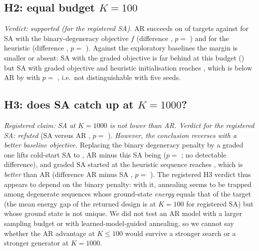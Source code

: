\subsection*{H2: equal budget $K=100$}
\emph{Verdict: supported (for the registered SA).} AR succeeds on  of targets against  for SA with the binary-degeneracy objective $f$ (difference , $p=$ ) and  for the heuristic (difference , $p=$ ). Against the exploratory baselines the margin is smaller or absent: SA with the graded objective is far behind at this budget () but SA with graded objective and heuristic initialisation reaches , which is below AR by  with $p=$ , i.e.\ not distinguishable with five seeds.

\subsection*{H3: does SA catch up at $K=1000$?}
\emph{Registered claim: SA at $K=1000$ is not lower than AR. Verdict for the registered SA: refuted} (SA  versus AR , $p=$ ). \emph{However, the conclusion reverses with a better baseline objective.} Replacing the binary degeneracy penalty by a graded one lifts cold-start SA to , AR minus this SA being  ($p=$ ; no detectable difference), and graded SA started at the heuristic sequence reaches , which is \emph{better} than AR (difference AR minus SA , $p=$ ). The registered H3 verdict thus appears to depend on the binary penalty: with it, annealing seems to be trapped among degenerate sequences whose ground-state \emph{energy} equals that of the target (the mean energy gap of the returned design is  at $K=100$ for registered SA) but whose ground state is not unique. We did not test an AR model with a larger sampling budget or with learned-model-guided annealing, so we cannot say whether the AR advantage at $K\le 100$ would survive a stronger search or a stronger generator at $K=1000$.

